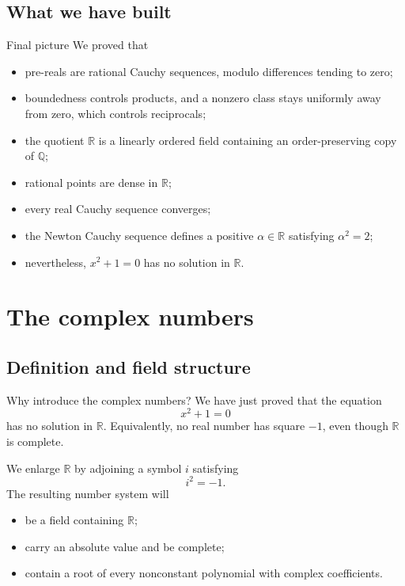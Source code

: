 \documentclass[aspectratio=169,11pt]{beamer}
\newcommand{\Q}{\mathbb Q}
\newcommand{\R}{\mathbb R}
\begin{document}
\subsection{What we have built}

\begin{frame}{Final picture}
  We proved that
  \begin{itemize}
    \item pre-reals are rational Cauchy sequences, modulo differences tending
      to zero;
    \item boundedness controls products, and a nonzero class stays uniformly
      away from zero, which controls reciprocals;
    \item the quotient \(\R\) is a linearly ordered field containing an
      order-preserving copy of \(\Q\);
    \item rational points are dense in \(\R\);
    \item every real Cauchy sequence converges;
    \item the Newton Cauchy sequence defines a positive
      \(\alpha\in\R\) satisfying \(\alpha^2=2\);
    \item nevertheless, \(x^2+1=0\) has no solution in \(\R\).
  \end{itemize}
\end{frame}

\section{The complex numbers}

\subsection{Definition and field structure}

\begin{frame}{Why introduce the complex numbers?}
  We have just proved that the equation
  \[
    x^2+1=0
  \]
  has no solution in \(\R\).  Equivalently, no real number has square
  \(-1\), even though \(\R\) is complete.

  We enlarge \(\R\) by adjoining a symbol \(i\) satisfying
  \[
    \boxed{i^2=-1.}
  \]
  The resulting number system will
  \begin{itemize}
    \item be a field containing \(\R\);
    \item carry an absolute value and be complete;
    \item contain a root of every nonconstant polynomial with complex
      coefficients.
  \end{itemize}
\end{frame}
\end{document}
